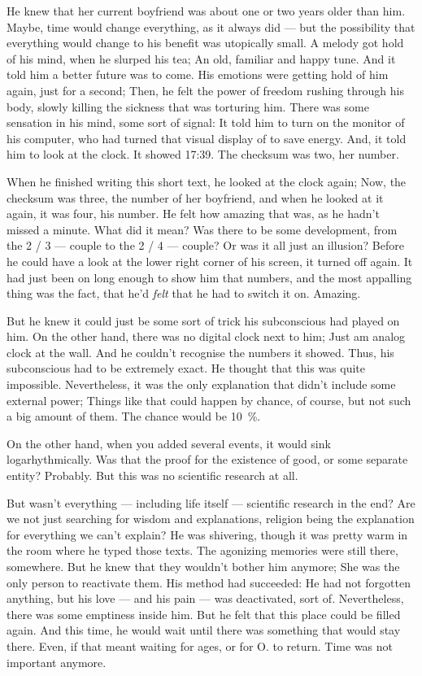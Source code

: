 He knew that her current boyfriend was about one or two years older than him. 
Maybe, time would change everything, as it always did --- but the possibility that everything would change to his benefit was utopically small. 
A melody got hold of his mind, when he slurped his tea; An old, familiar and happy tune. 
And it told him a better future was to come. 
His emotions were getting hold of him again, just for a second; Then, he felt the power of freedom rushing through his body, slowly killing the sickness that was torturing him. 
There was some sensation in his mind, some sort of signal: It told him to turn on the monitor of his computer, who had turned that visual display of to save energy. 
And, it told him to look at the clock. 
It showed 17:39. 
The checksum was two, her number.

When he finished writing this short text, he looked at the clock again; Now, the checksum was three, the number of her boyfriend, and when he looked at it again, it was four, his number. 
He felt how amazing that was, as he hadn't missed a minute. 
What did it mean? Was there to be some development, from the 2 / 3 --- couple to the 2 / 4 --- couple? Or was it all just an illusion?
Before he could have a look at the lower right corner of his screen, it turned off again. 
It had just been on long enough to show him that numbers, and the most appalling thing was the fact, that he'd \emph{felt} that he had to switch it on. 
Amazing.

But he knew it could just be some sort of trick his subconscious had played on him. 
On the other hand, there was no digital clock next to him; Just am analog clock at the wall. 
And he couldn't recognise the numbers it showed. 
Thus, his subconscious had to be extremely exact. 
He thought that this was quite impossible. 
Nevertheless, it was the only explanation that didn't include some external power; Things like that could happen by chance, of course, but not such a big amount of them. 
The chance would be \SI{10}{\percent}.

On the other hand, when you added several events, it would sink logarhythmically. 
Was that the proof for the existence of good, or some separate entity?
Probably. 
But this was no scientific research at all.

But wasn't everything --- including life itself --- scientific research in the end?
Are we not just searching for wisdom and explanations, religion being the explanation for everything we can't explain?
He was shivering, though it was pretty warm in the room where he typed those texts. 
The agonizing memories were still there, somewhere. 
But he knew that they wouldn't bother him anymore; She was the only person to reactivate them. 
His method had succeeded: He had not forgotten anything, but his love ---  and his pain --- was deactivated, sort of. 
Nevertheless, there was some emptiness inside him. But he felt that this place could be filled again. 
And this time, he would wait until there was something that would stay there. 
Even, if that meant waiting for ages, or for O. to return. 
Time was not important anymore.

